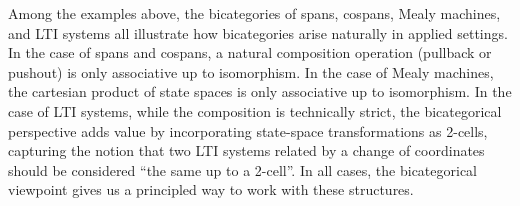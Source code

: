 \begin{remark}
    Among the examples above, the bicategories of spans, cospans, Mealy machines, and LTI systems all illustrate how bicategories arise naturally in applied settings.
    In the case of spans and cospans, a natural composition operation (pullback or pushout) is only associative up to isomorphism.
    In the case of Mealy machines, the cartesian product of state spaces is only associative up to isomorphism.
    In the case of LTI systems, while the composition is technically strict, the bicategorical perspective adds value by incorporating state-space transformations as 2-cells, capturing the notion that two LTI systems related by a change of coordinates should be considered ``the same up to a 2-cell''.
    In all cases, the bicategorical viewpoint gives us a principled way to work with these structures.
\end{remark}



